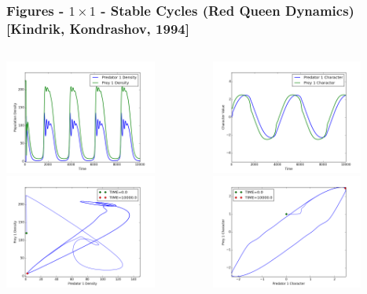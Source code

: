 \documentclass[10pt]{beamer}
\begin{document}
\begin{frame}
	\frametitle{Figures - $1\times1$ - Stable Cycles {\normalsize(Red Queen Dynamics)}{\tiny[Kindrik, Kondrashov, 1994]}}
	\begin{columns}[t]
		\begin{column}{.5\textwidth}
			\centering
			\includegraphics[width=5cm,height=3.75cm]{figures/1x1/variable_growth/stable_cycles/densities.png}\\
			\includegraphics[width=5cm,height=3.75cm]{figures/1x1/variable_growth/stable_cycles/density_phase_plane.png}
		\end{column}
		\begin{column}{.5\textwidth}
			\centering
			\includegraphics[width=5cm,height=3.75cm]{figures/1x1/variable_growth/stable_cycles/traits.png}\\
			\includegraphics[width=5cm,height=3.75cm]{figures/1x1/variable_growth/stable_cycles/trait_phase_plane.png}
		\end{column}
	\end{columns}
\end{frame}
\end{document}
